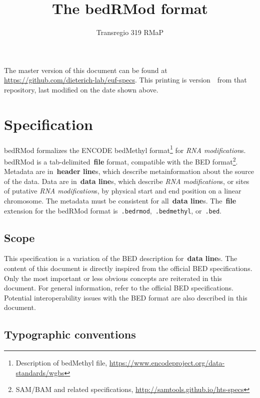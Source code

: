 \documentclass[11pt]{article}
\title{The \acf{bedRMod} format}
\author{Transregio 319 RMaP}
\date{\headdate}
\providecommand*{\Ac}[1]{\ac{#1}} %
\begin{document}
\maketitle

\begin{small}
\noindent
The master version of this document can be found at \url{https://github.com/dieterich-lab/euf-specs}.
This printing is version~\commitdesc\ from that repository, last modified on the date shown above.
\end{small}


\section{Specification}

\Ac{bedRMod} formalizes the ENCODE bedMethyl format\footnote{Description of bedMethyl file, \url{https://www.encodeproject.org/data-standards/wgbs}} for \emph{RNA modification}s. \Ac{bedRMod} is a tab-delimited~\textbf{file} format, compatible with the \acf{BED} format\footnote{SAM/BAM and related specifications, \url{http://samtools.github.io/hts-specs}}. Metadata are in~\textbf{header line}s, which describe metainformation about the source of the data. Data are in~\textbf{data line}s, which describe \emph{RNA modification}s, or sites of putative \emph{RNA modification}s, by physical start and end position on a linear chromosome. The metadata must be consistent for all~\textbf{data line}s. The~\textbf{file} extension for the \ac{bedRMod} format is~\texttt{.bedrmod},~\texttt{.bedmethyl}, or~\texttt{.bed}.

\subsection{Scope}

This specification is a variation of the \ac{BED} description for~\textbf{data line}s. The content of this document is directly inspired from the 
official \ac{BED} specifications. Only the most important or less obvious concepts are reiterated in this document. For general information, refer to the official \ac{BED} specifications. Potential interoperability issues with the \ac{BED} format are also described in this document.

\subsection{Typographic conventions}
\end{document}
